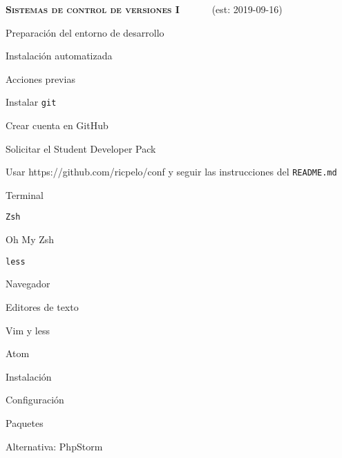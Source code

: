 \begin{longenum}
    \item \textbf{\textsc{Sistemas de control de versiones I}} \ \ \ \ \ \ (est: \mbox{2019-09-16})
    \begin{longenum}
        \item Preparación del entorno de desarrollo
        \begin{longenum}
            \item Instalación automatizada
            \begin{longenum}
                \item Acciones previas
                \begin{longenum}
                    \item Instalar \texttt{git}
                    \item Crear cuenta en GitHub
                    \item Solicitar el Student Developer Pack
                \end{longenum}
                \item Usar https://github.com/ricpelo/conf y seguir las instrucciones del \texttt{README.md}
            \end{longenum}
            \item Terminal
            \begin{longenum}
                \item \texttt{Zsh}
                \item Oh My Zsh
                \item \texttt{less}
            \end{longenum}
            \item Navegador
            \item Editores de texto
            \begin{longenum}
                \item Vim y less
                \item Atom
                \begin{longenum}
                    \item Instalación
                    \item Configuración
                    \item Paquetes
                \end{longenum}
                \item Alternativa: PhpStorm
            \end{longenum}

\end{longenum}
\end{longenum}
\end{longenum}

